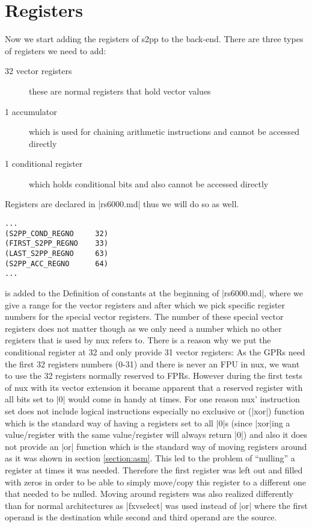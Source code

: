\section{Registers}
\label{section:register}
Now we start adding the registers of s2pp to the back-end.
There are three types of registers we need to add:
\begin{description}
    \item[32 vector registers] these are normal registers that hold vector values
    \item[1 accumulator] which is used for chaining arithmetic instructions and cannot be accessed directly
    \item[1 conditional register] which holds conditional bits and also cannot be accessed directly
\end{description}
Registers are declared in |rs6000.md| thus we will do so as well.
\begin{lstlisting}
...
(S2PP_COND_REGNO     32)
(FIRST_S2PP_REGNO    33)
(LAST_S2PP_REGNO     63)
(S2PP_ACC_REGNO      64)
...
\end{lstlisting}
is added to the Definition of constants at the beginning of |rs6000.md|, where we give a range for the vector registers and after which we pick specific register numbers for the special vector registers.
The number of these special vector registers does not matter though as we only need a number which no other registers that is used by nux refers to.
There is a reason why we put the conditional register at 32 and only provide 31 vector registers:
As the GPRs need the first 32 registers numbers (0-31) and there is never an FPU in nux, we want to use the 32 registers normally reserved to FPRs.
However during the first tests of nux with its vector extension it became apparent that a reserved register with all bits set to |0| would come in handy at times.
For one reason nux' instruction set does not include logical instructions especially no exclusive or (|xor|) function which is the standard way of having a registers set to all |0|s (since |xor|ing a value/register with the same value/register will always return |0|) and also it does not provide an |or| function which is the standard way of moving registers around as it was shown in section \ref{section:asm}.
This led to the problem of ``nulling'' a register at times it was needed.
Therefore the first register was left out and filled with zeros in order to be able to simply move/copy this register to a different one that needed to be nulled.
Moving around registers was also realized differently than for normal architectures as |fxvselect| was used instead of |or| where the first operand is the destination while second and third operand are the source.
